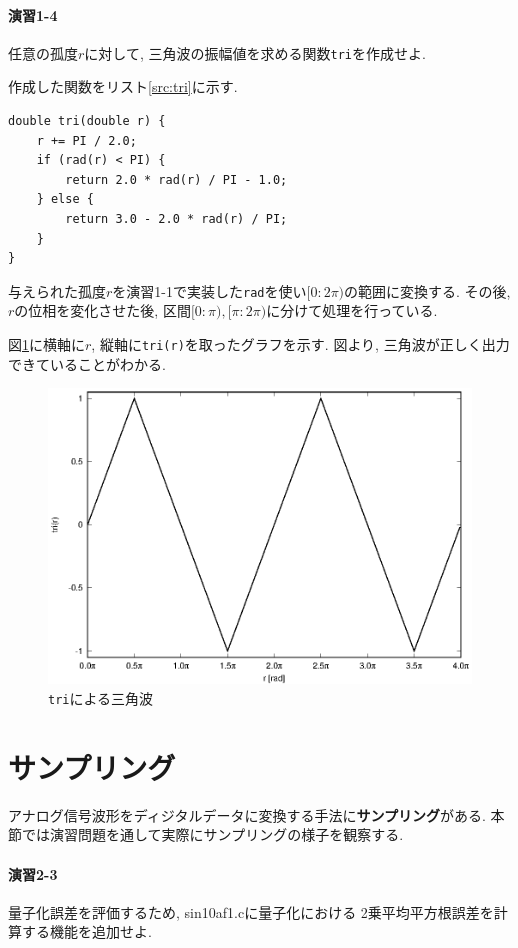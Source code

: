 \documentclass[titlepage]{jsarticle}
\begin{document}
    \paragraph{演習1-4} 任意の孤度$r$に対して, 三角波の振幅値を求める関数\verb|tri|を作成せよ.

        作成した関数をリスト\ref{src:tri}に示す.

        \begin{lstlisting}[caption=tri.c, label=src:tri]
double tri(double r) {
    r += PI / 2.0;
    if (rad(r) < PI) {
        return 2.0 * rad(r) / PI - 1.0;
    } else {
        return 3.0 - 2.0 * rad(r) / PI;
    }
}\end{lstlisting}

        与えられた孤度$r$を演習1-1で実装した\verb|rad|を使い$[0:2\pi)$の範囲に変換する.
        その後, $r$の位相を変化させた後, 区間$[0:\pi), [\pi:2\pi)$に分けて処理を行っている.

        図\ref{fig:tri}に横軸に$r$, 縦軸に\verb|tri(r)|を取ったグラフを示す.
        図より, 三角波が正しく出力できていることがわかる.

        \begin{figure}[h]
            \centering
            \includegraphics[width=0.8\hsize]{images/tri.eps}
            \cprotect\caption{\verb|tri|による三角波}
            \label{fig:tri}
        \end{figure}

\section{サンプリング}
    アナログ信号波形をディジタルデータに変換する手法に\textbf{サンプリング}がある.
    本節では演習問題を通して実際にサンプリングの様子を観察する.

    \paragraph{演習2-3} 量子化誤差を評価するため, sin10af1.cに量子化における
    2乗平均平方根誤差を計算する機能を追加せよ.
\end{document}

